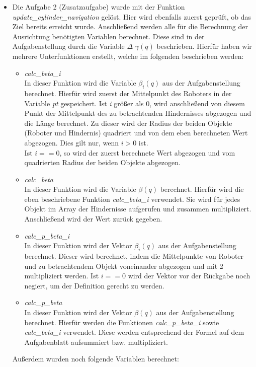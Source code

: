 \documentclass[a4paper]{scrartcl}
\begin{document}
\begin{itemize}
\item Die Aufgabe 2 (Zusatzaufgabe) wurde mit der Funktion \textit{update\_cylinder\_navigation} gelöst. Hier wird ebenfalls zuerst geprüft, ob das Ziel bereits erreicht wurde. Anschließend werden alle für die Berechnung der Ausrichtung benötigten Variablen berechnet. Diese sind in der Aufgabenstellung durch die Variable $\Delta$ $\gamma(q)$ beschrieben. Hierfür haben wir mehrere Unterfunktionen erstellt, welche im folgenden beschrieben werden:
\begin{itemize}
\item \textit{calc\_beta\_i}\\
In dieser Funktion wird die Variable $\beta_i(q)$ aus der Aufgabenstellung berechnet. Hierfür wird zuerst der Mittelpunkt des Roboters in der Variable \textit{pt} gespeichert. Ist \textit{i} größer als 0, wird anschließend von diesem Punkt der Mittelpunkt des zu betrachtenden Hindernisses abgezogen und die Länge berechnet. Zu dieser wird der Radius der beiden Objekte (Roboter und Hindernis) quadriert und von dem eben berechneten Wert abgezogen. Dies gilt nur, wenn $i > 0$ ist.\\
Ist $i==0$, so wird der zuerst berechnete Wert abgezogen und vom quadrierten Radius der beiden Objekte abgezogen.
\item \textit{calc\_beta}\\
In dieser Funktion wird die Variable $\beta(q)$ berechnet. Hierfür wird die eben beschriebene Funktion \textit{calc\_beta\_i} verwendet. Sie wird für jedes Objekt im Array der Hindernisse aufgerufen und zusammen multipliziert. Anschließend wird der Wert zurück gegeben.
\item \textit{calc\_p\_beta\_i}\\
In dieser Funktion wird der Vektor $\beta_i(q)$ aus der Aufgabenstellung berechnet. Dieser wird berechnet, indem die Mittelpunkte von Roboter und zu betrachtendem Objekt voneinander abgezogen und mit 2 multipliziert werden. Ist $i == 0$ wird der Vektor vor der Rückgabe noch negiert, um der Definition gerecht zu werden.
\item \textit{calc\_p\_beta}\\
In dieser Funktion wird der Vektor $\beta(q)$ aus der Aufgabenstellung berechnet. Hierfür werden die Funktionen \textit{calc\_p\_beta\_i} sowie \textit{calc\_beta\_i} verwendet. Diese werden entsprechend der Formel auf dem Aufgabenblatt aufsummiert bzw. multipliziert.
\end{itemize}
Außerdem wurden noch folgende Variablen berechnet:
\begin{itemize}

\end{itemize}
\end{itemize}
\end{document}
